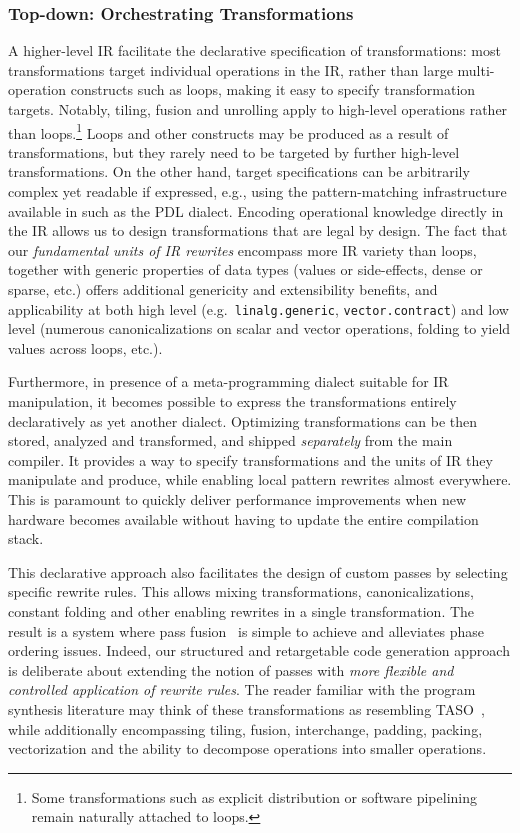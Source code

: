 \subsubsection{Top-down: Orchestrating Transformations}
A higher-level IR facilitate the declarative specification of transformations:
most transformations target individual operations in the IR, rather than large multi-operation constructs such as loops, making it easy to specify transformation targets.
Notably, tiling, fusion and unrolling apply to high-level operations rather than loops.\footnote{Some transformations such as explicit distribution or software pipelining remain naturally attached to loops.}
Loops and other constructs may be produced as a result of transformations, but they rarely need to be targeted by further high-level transformations.
On the other hand, target specifications can be arbitrarily complex yet readable if expressed, e.g., using the pattern-matching infrastructure available in \MLIR such as the PDL dialect.
Encoding operational knowledge directly in the IR allows us to design transformations that are legal by design. The fact that our \emph{fundamental units of IR rewrites} encompass more IR variety than loops, together with generic properties of data types (values or side-effects, dense or sparse, etc.) offers additional genericity and extensibility benefits, and applicability at both high level (e.g.\ \lstinline|linalg.generic|, \lstinline|vector.contract|) and low level (numerous canonicalizations on scalar and vector operations, folding to yield values across loops, etc.).

Furthermore, in presence of a meta-programming dialect suitable for IR manipulation, it becomes possible to express the transformations entirely declaratively as yet another \MLIR dialect.
Optimizing transformations can be then stored, analyzed and transformed, and shipped \emph{separately} from the main compiler.
It provides a way to specify transformations and the units of IR they manipulate and produce, while enabling local pattern rewrites almost everywhere.
This is paramount to quickly deliver performance improvements when new hardware becomes available without having to update the entire compilation stack.

This declarative approach also facilitates the design of custom passes by selecting specific rewrite rules. This allows mixing transformations, canonicalizations, constant folding and other enabling rewrites in a single transformation. The result is a system where pass fusion~\cite{Click95} is simple to achieve and alleviates phase ordering issues.
Indeed, our structured and retargetable code generation approach is deliberate about extending the notion of passes with \emph{more flexible and
controlled application of rewrite rules}.
The reader familiar with the program synthesis literature may think of these transformations as resembling TASO~\cite{TASO}, while additionally encompassing tiling, fusion, interchange, padding, packing, vectorization and the ability to decompose operations into smaller operations.

